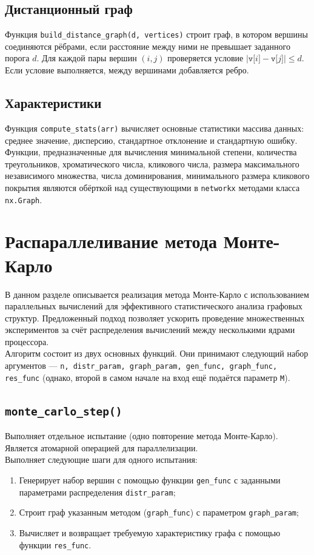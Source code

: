 \documentclass[12pt,a4paper]{report}
\begin{document}
\subsection{Дистанционный граф}
Функция \texttt{build\_distance\_graph(d, vertices)} строит граф, в котором вершины соединяются рёбрами, если расстояние между ними не превышает заданного порога $d$.
Для каждой пары вершин $(i, j)$ проверяется условие $|\texttt{v[$i$]} - \texttt{v[$j$]}| \le d$. Если условие выполняется, между вершинами добавляется ребро.
\subsection{Характеристики}
Функция \texttt{compute\_stats(arr)} вычисляет основные статистики массива данных: среднее значение, дисперсию, стандартное отклонение и стандартную ошибку.\\
Функции, предназначенные для вычисления минимальной степени, количества треугольников, хроматического числа, кликового числа, размера максимального независимого множества, числа доминирования, минимального размера кликового покрытия являются обёрткой над существующими в \texttt{networkx} методами класса \texttt{nx.Graph}.
\section{Распараллеливание метода Монте-Карло}
В данном разделе описывается реализация метода Монте-Карло с использованием параллельных вычислений для эффективного статистического анализа графовых структур. Предложенный подход позволяет ускорить проведение множественных экспериментов за счёт распределения вычислений между несколькими ядрами процессора.\\
Алгоритм состоит из двух основных функций. Они принимают следующий набор аргументов — \texttt{n, distr\_param, graph\_param, gen\_func, graph\_func, res\_func} (однако, второй в самом начале на вход ещё подаётся параметр \texttt{M}).
\subsection{\texttt{monte\_carlo\_step()}}
Выполняет отдельное испытание (одно повторение метода Монте-Карло). Является атомарной операцией для параллелизации.\\
Выполняет следующие шаги для одного испытания:
\begin{enumerate}
    \item Генерирует набор вершин с помощью функции \texttt{gen\_func} с заданными параметрами распределения \texttt{distr\_param};
    \item Строит граф указанным методом (\texttt{graph\_func}) с параметром \texttt{graph\_param};
    \item Вычисляет и возвращает требуемую характеристику графа с помощью функции \texttt{res\_func}.
\end{enumerate}
\end{document}

